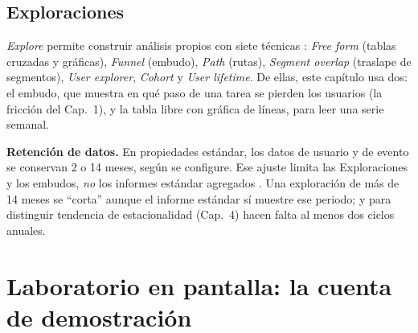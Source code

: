 \subsection{Exploraciones}

\textit{Explore} permite construir análisis propios con siete técnicas
\parencite{google2026ga4explorar}: \textit{Free form} (tablas cruzadas y
gráficas), \textit{Funnel} (embudo), \textit{Path} (rutas), \textit{Segment
overlap} (traslape de segmentos), \textit{User explorer}, \textit{Cohort} y
\textit{User lifetime}. De ellas, este capítulo usa dos: el embudo, que
muestra en qué paso de una tarea se pierden los usuarios (la fricción del
Cap.~1), y la tabla libre con gráfica de líneas, para leer una serie semanal.

\begin{cajaAtencion}
\textbf{Retención de datos.} En propiedades estándar, los datos de usuario y
de evento se conservan 2 o 14 meses, según se configure. Ese ajuste limita las
Exploraciones y los embudos, \emph{no} los informes estándar agregados
\parencite{google2026ga4retencion}. Una exploración de más de 14 meses se
\enquote{corta} aunque el informe estándar sí muestre ese periodo; y para
distinguir tendencia de estacionalidad (Cap.~4) hacen falta al menos dos
ciclos anuales.
\end{cajaAtencion}

\section{Laboratorio en pantalla: la cuenta de demostración}

